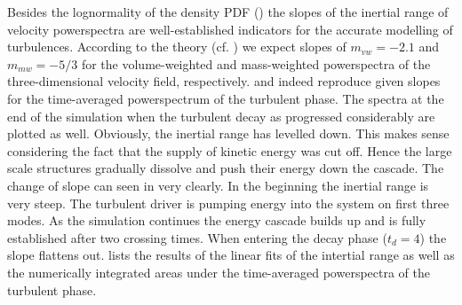 
Besides the lognormality of the density PDF () the
slopes of the inertial range of velocity powerspectra are well-established
indicators for the accurate modelling of turbulences. According to the theory
(cf.  ) we expect slopes of $m_{vw} =
-2.1$ and $m_{mw} = -5/3$ for the volume-weighted and mass-weighted
powerspectra of the three-dimensional velocity field, respectively.
 and
 indeed reproduce
given slopes for the time-averaged powerspectrum of the turbulent phase.  The
spectra at the end of the simulation when the turbulent decay as progressed
considerably are plotted as well. Obviously, the inertial range has levelled
down. This makes sense considering the fact that the supply of kinetic energy
was cut off. Hence the large scale structures gradually dissolve and
push their energy down the cascade. The change of slope can seen in
 very clearly. In
the beginning the inertial range is very steep. The turbulent driver is pumping
energy into the system on first three modes. As the simulation continues the
energy cascade builds up and is fully established after two crossing times.
When entering the decay phase ($t_d = 4$) the slope flattens out.
 lists the results of the linear fits of the intertial range
as well as the numerically integrated areas under the time-averaged powerspectra
of the turbulent phase.

